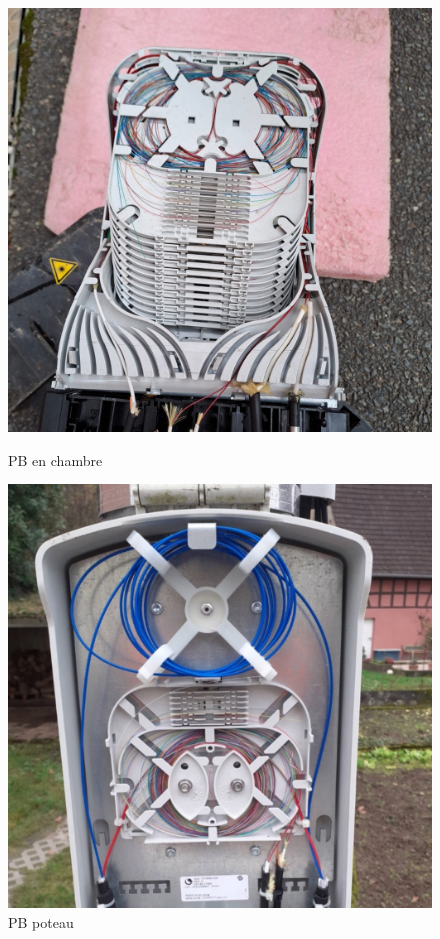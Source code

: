 \documentclass[12pt, a4paper]{article}
\begin{document}
\begin{figure}[htbp]
    \centering
    \begin{minipage}[b]{0.4\textwidth}
		{\includegraphics[width=\textwidth]{img/pbc.jpg}}
      \caption{PB en chambre}
    \end{minipage}
    \hspace{0.5cm} %
    \begin{minipage}[b]{0.4\textwidth}
      \includegraphics[width=\textwidth]{img/pbp.jpg}
      \caption{PB poteau}
    \end{minipage}
\end{figure}
\end{document}
